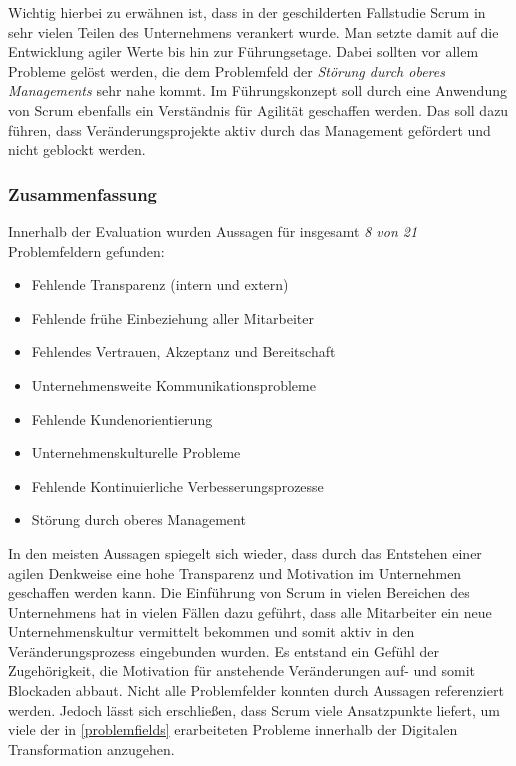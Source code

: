 Wichtig hierbei zu erwähnen ist, dass in der geschilderten Fallstudie Scrum in sehr vielen Teilen des Unternehmens verankert wurde. Man setzte damit auf die Entwicklung agiler Werte bis hin zur Führungsetage. Dabei sollten vor allem Probleme gelöst werden, die dem Problemfeld der \textit{Störung durch oberes Managements} sehr nahe kommt. Im Führungskonzept soll durch eine Anwendung von Scrum ebenfalls ein Verständnis für Agilität geschaffen werden. Das soll dazu führen, dass Veränderungsprojekte aktiv durch das Management gefördert und nicht geblockt werden.

\subsubsection{Zusammenfassung}

Innerhalb der Evaluation wurden Aussagen für insgesamt \textit{8 von 21} Problemfeldern gefunden:

\begin{itemize}[noitemsep, topsep=0pt]
	\item Fehlende Transparenz (intern und extern)
	\item Fehlende frühe Einbeziehung aller Mitarbeiter
	\item Fehlendes Vertrauen, Akzeptanz und Bereitschaft
	\item Unternehmensweite Kommunikationsprobleme
	\item Fehlende Kundenorientierung
	\item Unternehmenskulturelle Probleme
	\item Fehlende Kontinuierliche Verbesserungsprozesse
	\item Störung durch oberes Management
\end{itemize}

In den meisten Aussagen spiegelt sich wieder, dass durch das Entstehen einer agilen Denkweise eine hohe Transparenz und Motivation im Unternehmen geschaffen werden kann. Die Einführung von Scrum in vielen Bereichen des Unternehmens hat in vielen Fällen dazu geführt, dass alle Mitarbeiter ein neue Unternehmenskultur vermittelt bekommen und somit aktiv in den Veränderungsprozess eingebunden wurden. Es entstand ein Gefühl der Zugehörigkeit, die Motivation für anstehende Veränderungen auf- und somit Blockaden abbaut. Nicht alle Problemfelder konnten durch Aussagen referenziert werden. Jedoch lässt sich erschließen, dass Scrum viele Ansatzpunkte liefert, um viele der in \ref{problemfields} erarbeiteten Probleme innerhalb der Digitalen Transformation anzugehen.


